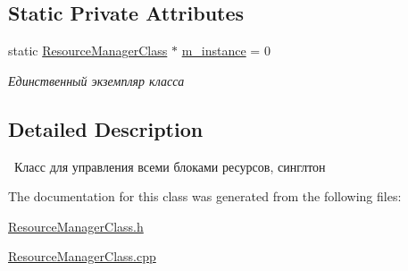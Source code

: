\subsection*{Static Private Attributes}
\begin{DoxyCompactItemize}
\item 
static \hyperlink{class_resource_manager_class}{Resource\+Manager\+Class} $\ast$ \hyperlink{group___resource_managment_ga1e74a4a5bc44d36ec144f2d623ef9ac9}{m\+\_\+instance} = 0
\begin{DoxyCompactList}\small\item\em Единственный экземпляр класса \end{DoxyCompactList}\end{DoxyCompactItemize}


\subsection{Detailed Description}
 Класс для управления всеми блоками ресурсов, синглтон 

The documentation for this class was generated from the following files\+:\begin{DoxyCompactItemize}
\item 
\hyperlink{_resource_manager_class_8h}{Resource\+Manager\+Class.\+h}\item 
\hyperlink{_resource_manager_class_8cpp}{Resource\+Manager\+Class.\+cpp}\end{DoxyCompactItemize}
